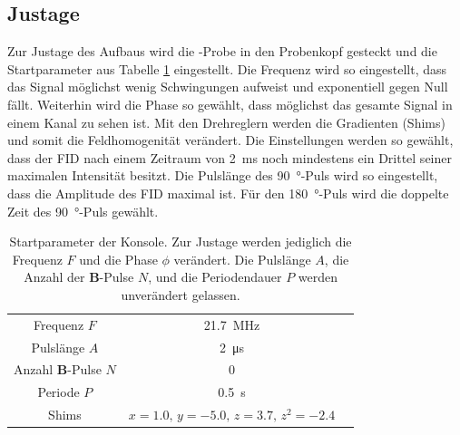 \subsection{Justage}
Zur Justage des Aufbaus wird die -Probe in den Probenkopf gesteckt und die Startparameter aus Tabelle \ref{tab:Startparameter} eingestellt.
Die Frequenz wird so eingestellt, dass das Signal möglichst wenig Schwingungen aufweist und exponentiell gegen Null fällt.
Weiterhin wird die Phase so gewählt, dass möglichst das gesamte Signal in einem Kanal zu sehen ist.
Mit den Drehreglern werden die Gradienten (Shims) und somit die Feldhomogenität verändert. Die Einstellungen werden so gewählt, dass der FID nach einem Zeitraum von \SI{2}{\milli\second} noch mindestens ein Drittel seiner maximalen Intensität besitzt.
Die Pulslänge des \SI{90}{\degree}-Puls wird so eingestellt, dass die Amplitude des FID maximal ist. Für den \SI{180}{\degree}-Puls wird die doppelte Zeit des \SI{90}{\degree}-Puls gewählt.

\begin{table}[H]
  \centering
  \caption{Startparameter der Konsole. Zur Justage werden jediglich die Frequenz $F$ und die Phase $\phi$ verändert. Die Pulslänge $A$, die Anzahl der \textbf{B}-Pulse $N$, und die Periodendauer $P$ werden unverändert gelassen.}
  \label{tab:Startparameter}
  \begin{tabular}{ccc}
    \toprule
    Frequenz $F$ & \SI{21.7}{\mega\hertz} \\
    Pulslänge $A$ & \SI{2}{\micro\second} \\
    Anzahl \textbf{B}-Pulse $N$ & 0 \\
    Periode $P$ & \SI{0.5}{\second} \\
    Shims & $x = \num{1.0}, \,  y = \num{-5.0}, \, z = \num{3.7}, \, z^2 = \num{-2.4}$ \\
    \bottomrule
  \end{tabular}
\end{table}


